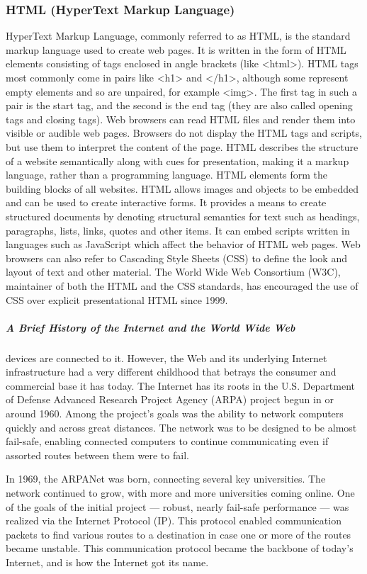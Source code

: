 \subsubsection{HTML (HyperText Markup Language)}
HyperText Markup Language, commonly referred to as HTML, is the standard markup language used to create web pages. It is written in the form of HTML elements consisting of tags enclosed in angle brackets (like <html>). HTML tags most commonly come in pairs like <h1> and </h1>, although some represent empty elements and so are unpaired, for example <img>. The first tag in such a pair is the start tag, and the second is the end tag (they are also called opening tags and closing tags).
Web browsers can read HTML files and render them into visible or audible web pages. Browsers do not display the HTML tags and scripts, but use them to interpret the content of the page. HTML describes the structure of a website semantically along with cues for presentation, making it a markup language, rather than a programming language.
HTML elements form the building blocks of all websites. HTML allows images and objects to be embedded and can be used to create interactive forms. It provides a means to create structured documents by denoting structural semantics for text such as headings, paragraphs, lists, links, quotes and other items. It can embed scripts written in languages such as JavaScript which affect the behavior of HTML web pages.
Web browsers can also refer to Cascading Style Sheets (CSS) to define the look and layout of text and other material. The World Wide Web Consortium (W3C), maintainer of both the HTML and the CSS standards, has encouraged the use of CSS over explicit presentational HTML since 1999.
\subparagraph*{A Brief History of the Internet and the World Wide Web}
\hfill \break
devices are connected to it. However, the Web and its underlying Internet infrastructure had a
very different childhood that betrays the consumer and commercial base it has today.
The Internet has its roots in the U.S. Department of Defense Advanced Research Project Agency
(ARPA) project begun in or around 1960. Among the project’s goals was the ability to network
computers quickly and across great distances. The network was to be designed to be almost
fail-safe, enabling connected computers to continue communicating even if assorted routes
between them were to fail.\cite{2}

In 1969, the ARPANet was born, connecting several key universities. The network continued
to grow, with more and more universities coming online. One of the goals of the initial
project — robust, nearly fail-safe performance — was realized via the Internet Protocol (IP).
This protocol enabled communication packets to find various routes to a destination in case one
or more of the routes became unstable. This communication protocol became the backbone of
today’s Internet, and is how the Internet got its name.\cite{2}

